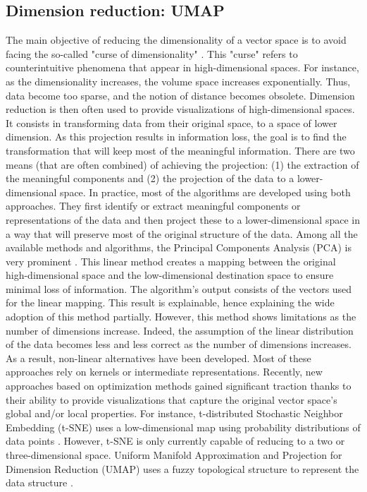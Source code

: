 \subsection{Dimension reduction: UMAP}
The main objective of reducing the dimensionality of a vector space is to avoid facing the
so-called "curse of dimensionality" \parencite{bellmanDynamicProgramming1966}.
This "curse" refers to counterintuitive phenomena that appear in high-dimensional spaces.
For instance, as the dimensionality increases, the volume space increases exponentially.
Thus, data become too sparse, and the notion of distance becomes obsolete.
Dimension reduction is then often used to provide visualizations of high-dimensional spaces.
It consists in transforming data from their original space, to a space of lower dimension.
As this projection results in information loss, the goal is to find the transformation
that will keep most of the meaningful information.
There are two means (that are often combined) of achieving the projection:
(1) the extraction of the meaningful components and
(2) the projection of the data to a lower-dimensional space.
In practice, most of the algorithms are developed using both approaches.
They first identify or extract meaningful components or representations of the data and then project these to a lower-dimensional space in a way that will preserve most of the original structure of the data.
Among all the available methods and algorithms, the Principal Components Analysis (PCA) is very prominent \parencite{hotellingAnalysisComplexStatistical1933}.
This linear method creates a mapping between the original high-dimensional space and the low-dimensional destination space to ensure minimal loss of information.
The algorithm's output consists of the vectors used for the linear mapping.
This result is explainable, hence explaining the wide adoption of this method partially.
However, this method shows limitations as the number of dimensions increase.
Indeed, the assumption of the linear distribution of the data becomes less and less correct as the number of dimensions increases.
As a result, non-linear alternatives have been developed.
Most of these approaches rely on kernels or intermediate representations.
Recently, new approaches based on optimization methods gained significant traction thanks to their ability to provide visualizations that capture the original vector space's global and/or local properties.
For instance, t-distributed Stochastic Neighbor Embedding (t-SNE) uses a low-dimensional
map using probability distributions of data points \parencite{maatenVisualizingDataUsing2008}.
However, t-SNE is only currently capable of reducing to a two or three-dimensional space.
Uniform Manifold Approximation and Projection for Dimension Reduction (UMAP) uses a fuzzy
topological structure to represent the data structure \parencite{mcinnesUMAPUniformManifold2020}.

